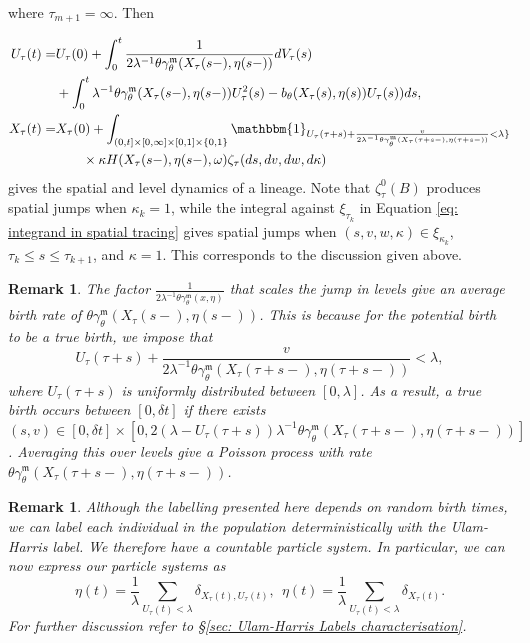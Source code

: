 \documentclass[12pt]{article}
\newtheorem{remark}[theorem]{Remark}
\begin{document}
where $\tau_{m+1}=\infty$. Then 

\begin{align*}
U_{\tau}(t)=&U_{\tau}(0)+\int_{0}^{t}\frac{1}{2\lambda^{-1} \theta \gamma^{\mathfrak{m}}_{\theta}(X_{\tau}(s-), \eta(s-))}dV_{\tau}(s)\\
&+\int_{0}^{t}\lambda^{-1} \theta \gamma^{\mathfrak{m}}_{\theta}(X_{\tau}(s-), \eta(s-))U^2_{\tau}(s)-b_{\theta}(X_{\tau}(s),\eta(s))U_{\tau}(s))ds,\\  
X_{\tau}(t)=&X_{\tau}(0)+\int_{(0,t]\times[0,\infty]\times[0,1]\times\{0,1\}}\mathbbm{1}_{U_{\tau}(\tau+s)+ \frac{v}{2\lambda^{-1} \theta \gamma^{\mathfrak{m}}_{\theta}(X_{\tau}(\tau+s-), \eta(\tau+s-))}<\lambda\}}\\
&\qquad \times \kappa   H(X_{\tau}(s-), \eta(s-),\omega)\zeta_{\tau}(ds,dv,dw,d\kappa)
\end{align*}
gives the spatial and level dynamics of a lineage. Note that $\zeta^{0}_{\tau}(B)$ produces spatial jumps when $\kappa_k=1$, while the integral against $\xi_{\tau_k}$ in Equation \eqref{eq: integrand in spatial tracing} gives spatial jumps when $(s,v,w,\kappa) \in \xi_{\kappa_k}$, $\tau_k \leq s \leq \tau_{k+1}$, and $\kappa = 1$. This corresponds to the discussion given above.
\begin{remark}
The factor $\frac{1}{2\lambda^{-1} \theta \gamma^{\mathfrak{m}}_{\theta}(x, \eta)}$ that scales the jump in levels give an average birth rate of $\theta \gamma^{\mathfrak{m}}_{\theta}(X_{\tau}(s-), \eta(s-))$. This is because for the potential birth to be a true birth, we impose that $$U_{\tau}(\tau+s)+ \frac{v}{2\lambda^{-1} \theta \gamma^{\mathfrak{m}}_{\theta}(X_{\tau}(\tau+s-), \eta(\tau+s-))}< \lambda,$$ where $U_{\tau}(\tau+s)$ is uniformly distributed between $[0, \lambda]$. As a result, a true birth occurs between $[0,\delta t]$ if there exists $(s,v) \in [0,\delta t]\times [0, 2 (\lambda-U_{\tau}(\tau+s)) \lambda^{-1} \theta \gamma^{\mathfrak{m}}_{\theta}(X_{\tau}(\tau+s-), \eta(\tau+s-))]$. Averaging this over levels give a Poisson process with rate $ \theta \gamma^{\mathfrak{m}}_{\theta}(X_{\tau}(\tau+s-), \eta(\tau+s-))$. 
\end{remark}
\begin{remark}
Although the labelling presented here depends on random birth times, we can label each individual in the population deterministically with the Ulam-Harris label. We therefore have a countable particle system. In particular, we can now express our particle systems as
$$\eta(t)=\frac{1}{\lambda}\sum_{U_{\tau}(t) < \lambda} \delta_{X_{\tau}(t),U_{\tau}(t)}, ~~\eta(t)=\frac{1}{\lambda}\sum_{ U_{\tau}(t) < \lambda} \delta_{X_{\tau}(t)}.$$
For further discussion refer to \S \ref{sec: Ulam-Harris Labels characterisation}.
\end{remark}
\end{document}
